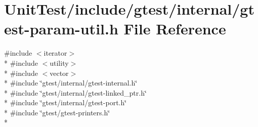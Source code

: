 \hypertarget{gtest-param-util_8h}{\section{Unit\+Test/include/gtest/internal/gtest-\/param-\/util.h File Reference}
\label{gtest-param-util_8h}
}
{\ttfamily \#include $<$iterator$>$}\\*
{\ttfamily \#include $<$utility$>$}\\*
{\ttfamily \#include $<$vector$>$}\\*
{\ttfamily \#include \char`\"{}gtest/internal/gtest-\/internal.\+h\char`\"{}}\\*
{\ttfamily \#include \char`\"{}gtest/internal/gtest-\/linked\+\_\+ptr.\+h\char`\"{}}\\*
{\ttfamily \#include \char`\"{}gtest/internal/gtest-\/port.\+h\char`\"{}}\\*
{\ttfamily \#include \char`\"{}gtest/gtest-\/printers.\+h\char`\"{}}\\*
